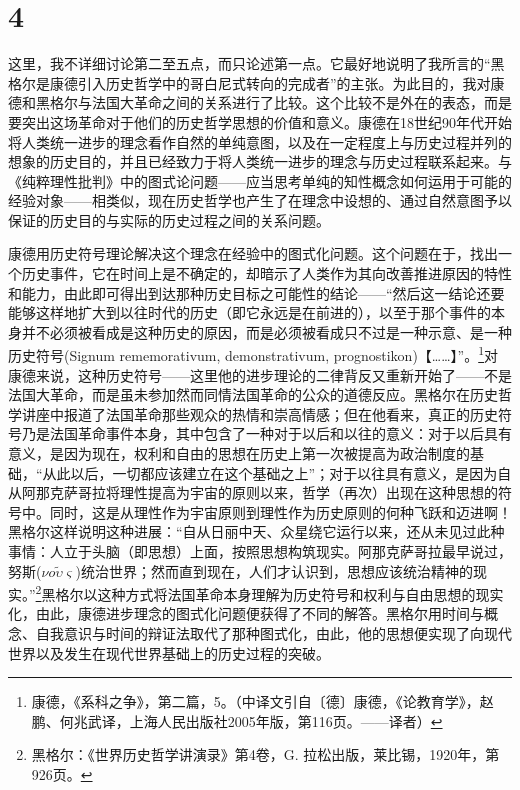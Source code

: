 \section*{4}

这里，我不详细讨论第二至五点，而只论述第一点。它最好地说明了我所言的“黑格尔是康德引入历史哲学中的哥白尼式转向的完成者”的主张。为此目的，我对康德和黑格尔与法国大革命之间的关系进行了比较。这个比较不是外在的表态，而是要突出这场革命对于他们的历史哲学思想的价值和意义。康德在18世纪90年代开始将人类统一进步的理念看作自然的单纯意图，以及在一定程度上与历史过程并列的想象的历史目的，并且已经致力于将人类统一进步的理念与历史过程联系起来。与《纯粹理性批判》中的图式论问题——应当思考单纯的知性概念如何运用于可能的经验对象——相类似，现在历史哲学也产生了在理念中设想的、通过自然意图予以保证的历史目的与实际的历史过程之间的关系问题。

康德用历史符号理论解决这个理念在经验中的图式化问题。这个问题在于，找出一个历史事件，它在时间上是不确定的，却暗示了人类作为其向改善推进原因的特性和能力，由此即可得出到达那种历史目标之可能性的结论——“然后这一结论还要能够这样地扩大到以往时代的历史（即它永远是在前进的），以至于那个事件的本身并不必须被看成是这种历史的原因，而是必须被看成只不过是一种示意、是一种历史符号(Signum rememorativum, demonstrativum, prognostikon)【……】”。\footnote{康德，《系科之争》，第二篇，5。（中译文引自〔德〕康德，《论教育学》，赵鹏、何兆武译，上海人民出版社2005年版，第116页。——译者）}对康德来说，这种历史符号——这里他的进步理论的二律背反又重新开始了——不是法国大革命，而是虽未参加然而同情法国革命的公众的道德反应。黑格尔在历史哲学讲座中报道了法国革命那些观众的热情和崇高情感；但在他看来，真正的历史符号乃是法国革命事件本身，其中包含了一种对于以后和以往的意义：对于以后具有意义，是因为现在，权利和自由的思想在历史上第一次被提高为政治制度的基础，“从此以后，一切都应该建立在这个基础之上”；对于以往具有意义，是因为自从阿那克萨哥拉将理性提高为宇宙的原则以来，哲学（再次）出现在这种思想的符号中。同时，这是从理性作为宇宙原则到理性作为历史原则的何种飞跃和迈进啊！黑格尔这样说明这种进展：“自从日丽中天、众星绕它运行以来，还从未见过此种事情：人立于头脑（即思想）上面，按照思想构筑现实。阿那克萨哥拉最早说过，努斯($\nu o\tilde{\upsilon}\varsigma$)统治世界；然而直到现在，人们才认识到，思想应该统治精神的现实。”\footnote{黑格尔：《世界历史哲学讲演录》第4卷，G. 拉松出版，莱比锡，1920年，第926页。}黑格尔以这种方式将法国革命本身理解为历史符号和权利与自由思想的现实化，由此，康德进步理念的图式化问题便获得了不同的解答。黑格尔用时间与概念、自我意识与时间的辩证法取代了那种图式化，由此，他的思想便实现了向现代世界以及发生在现代世界基础上的历史过程的突破。

